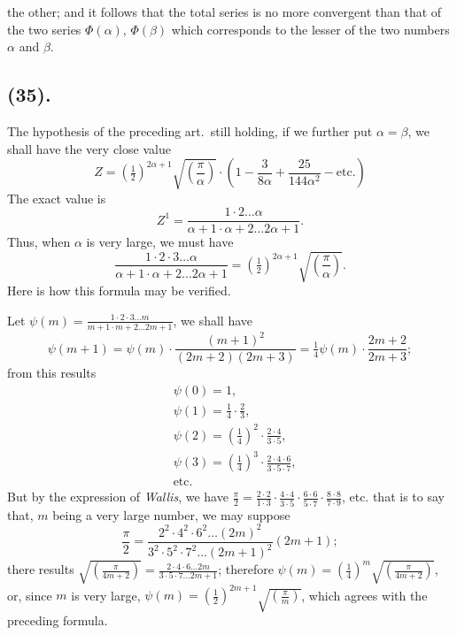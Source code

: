 \documentclass{article}
\begin{document}
the other; and it follows that the total series is no more convergent than that of the two series $\Phi(\alpha)$, $\Phi(\beta)$ which corresponds to the lesser of the two numbers $\alpha$ and $\beta$.

\subsection*{(35).}

The hypothesis of the preceding art.\ still holding, if we further put $\alpha=\beta$, we shall have the very close value
\[ Z=\left(\tfrac{1}{2}\right)^{2\alpha+1}\sqrt{\left(\frac{\pi}{\alpha}\right)}\cdot\left(1-\frac{3}{8\alpha}+\frac{25}{144\alpha^{2}}-\text{etc.}\right) \]
The exact value is
\[ Z^{1}=\frac{1\cdot2\ldots\alpha}{\alpha+1\cdot\alpha+2\ldots2\alpha+1}. \]
Thus, when $\alpha$ is very large, we must have
\[ \frac{1\cdot2\cdot3\ldots\alpha}{\alpha+1\cdot\alpha+2\ldots2\alpha+1}=\left(\tfrac{1}{2}\right)^{2\alpha+1}\sqrt{\left(\frac{\pi}{\alpha}\right)}. \]
Here is how this formula may be verified.

Let $\psi(m)=\frac{1\cdot2\cdot3\ldots m}{m+1\cdot m+2\ldots2m+1}$, we shall have
\[ \psi(m+1)=\psi(m)\cdot\frac{(m+1)^{2}}{(2m+2)(2m+3)}=\tfrac{1}{4}\psi(m)\cdot\frac{2m+2}{2m+3}; \]
from this results
\[ \begin{aligned} &\psi(0)=1,\\ &\psi(1)=\tfrac{1}{4}\cdot\tfrac{2}{3},\\ &\psi(2)=\left(\tfrac{1}{4}\right)^{2}\cdot\frac{2\cdot4}{3\cdot5},\\ &\psi(3)=\left(\tfrac{1}{4}\right)^{3}\cdot\frac{2\cdot4\cdot6}{3\cdot5\cdot7},\\ &\text{etc.} \end{aligned} \]
But by the expression of \emph{Wallis}, we have $\frac{\pi}{2}=\frac{2\cdot2}{1\cdot3}\cdot\frac{4\cdot4}{3\cdot5}\cdot\frac{6\cdot6}{5\cdot7}\cdot\frac{8\cdot8}{7\cdot9}$, etc. that is to say that, $m$ being a very large number, we may suppose
\[ \frac{\pi}{2}=\frac{2^{2}\cdot4^{2}\cdot6^{2}\ldots(2m)^{2}}{3^{2}\cdot5^{2}\cdot7^{2}\ldots(2m+1)^{2}}(2m+1); \]
there results $\sqrt{\left(\frac{\pi}{4m+2}\right)}=\frac{2\cdot4\cdot6\ldots2m}{3\cdot5\cdot7\ldots2m+1}$; therefore $\psi(m)=\left(\frac{1}{4}\right)^{m}\sqrt{\left(\frac{\pi}{4m+2}\right)}$, or, since $m$ is very large, $\psi(m)=\left(\frac{1}{2}\right)^{2m+1}\sqrt{\left(\frac{\pi}{m}\right)}$, which agrees with the preceding formula.
\end{document}
